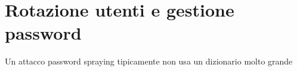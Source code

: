 \section{Rotazione utenti e gestione password}
Un attacco password spraying tipicamente non usa un dizionario molto grande 